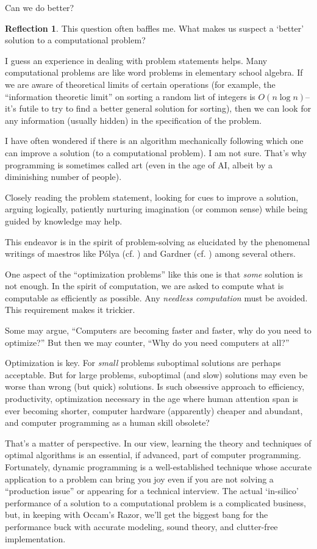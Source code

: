 \documentclass[english,notitlepage,smartquotes]{hgbreport}
\theoremstyle{definition}
\theoremstyle{definition}
\theoremstyle{remark}
\theoremstyle{definition}
\theoremstyle{plain}
\theoremstyle{definition}
\newtheorem{reflection}{Reflection}
\begin{document}
Can we do better?
\begin{reflection}
This question often baffles me. What makes us suspect a `better' solution to a computational problem? 

I guess an experience in dealing with problem statements helps. Many computational problems are like word problems in elementary school algebra. If we are aware of theoretical limits of certain operations (for example, the ``information theoretic limit'' on sorting a random list of integers is $O(n\log n)$--it's futile to try to find a better general solution for sorting), then we can look for any information (usually hidden) in the specification of the problem.

I have often wondered if there is an algorithm mechanically following which one can improve a solution (to a computational problem). I am not sure. That's why programming is sometimes called art (even in the age of AI, albeit by a diminishing number of people).

Closely reading the problem statement, looking for cues to improve a solution, arguing logically, patiently nurturing imagination (or common sense) while being guided by knowledge may help.

This endeavor is in the spirit of problem-solving as elucidated by the phenomenal writings of maestros like P\'olya (cf. \cite{Polya2004}) and Gardner (cf. \cite{GardnerSciAmColumns}) among several others.

One aspect of the ``optimization problems'' like this one is that \emph{some} solution is not enough. In the spirit of computation, we are asked to compute what is computable as efficiently as possible. Any \emph{needless computation} must be avoided. This requirement makes it trickier.

Some may argue, ``Computers are becoming faster and faster, why do you need to optimize?'' But then we may counter, ``Why do you need computers at all?''

Optimization is key. For \emph{small} problems suboptimal solutions are perhaps acceptable. But for large problems, suboptimal (and slow) solutions may even be worse than wrong (but quick) solutions. Is such obsessive approach to efficiency, productivity, optimization necessary in the age where human attention span is ever becoming shorter, computer hardware (apparently) cheaper and abundant, and computer programming as a human skill obsolete? 

That's a matter of perspective. In our view, learning the theory and techniques of optimal algorithms is an essential, if advanced, part of computer programming. Fortunately, dynamic programming is a well-established technique whose accurate application to a problem can bring you joy even if you are not solving a ``production issue'' or appearing for a technical interview. The actual `in-silico' performance of a solution to a computational problem is a complicated business, but, in keeping with Occam's Razor, we'll get the biggest bang for the performance buck with accurate modeling, sound theory, and clutter-free implementation.


\end{reflection}
\end{document}
